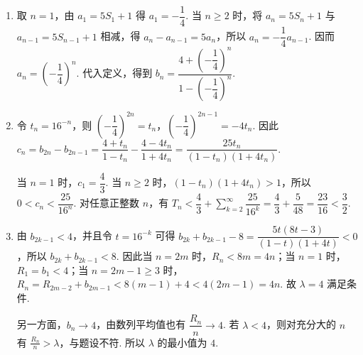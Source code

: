 \begin{solution}
\begin{enumerate}
\item 取 \(n=1\)，由 \(a_1=5S_1+1\) 得 \(a_1=-\dfrac14\). 当 \(n\geqslant2\) 时，将 \(a_n=5S_n+1\) 与 \(a_{n-1}=5S_{n-1}+1\) 相减，得 \(a_n-a_{n-1}=5a_n\)，所以 \(a_n=-\dfrac14a_{n-1}\). 因而 \(a_n=\left(-\dfrac14\right)^n\). 代入定义，得到 \(b_n=\dfrac{4+\left(-\dfrac14\right)^n}{1-\left(-\dfrac14\right)^n}\).
\item 令 \(t_n=16^{-n}\)，则 \(\left(-\dfrac14\right)^{2n}=t_n\)，\(\left(-\dfrac14\right)^{2n-1}=-4t_n\). 因此
\(c_n=b_{2n}-b_{2n-1}=\dfrac{4+t_n}{1-t_n}-\dfrac{4-4t_n}{1+4t_n}=\dfrac{25t_n}{(1-t_n)(1+4t_n)}\).

当 \(n=1\) 时，\(c_1=\dfrac43\). 当 \(n\geqslant2\) 时，\((1-t_n)(1+4t_n)>1\)，所以 \(0<c_n<\dfrac{25}{16^n}\). 对任意正整数 \(n\)，有 \(T_n<\dfrac43+\sum_{k=2}^{\infty}\dfrac{25}{16^k}=\dfrac43+\dfrac5{48}=\dfrac{23}{16}<\dfrac32\).
\item 由 \(b_{2k-1}<4\)，并且令 \(t=16^{-k}\) 可得 \(b_{2k}+b_{2k-1}-8=\dfrac{5t(8t-3)}{(1-t)(1+4t)}<0\)，所以 \(b_{2k}+b_{2k-1}<8\). 因此当 \(n=2m\) 时，\(R_n<8m=4n\)；当 \(n=1\) 时，\(R_1=b_1<4\)；当 \(n=2m-1\geqslant3\) 时，\(R_n=R_{2m-2}+b_{2m-1}<8(m-1)+4<4(2m-1)=4n\). 故 \(\lambda=4\) 满足条件.

另一方面，\(b_n\to4\)，由数列平均值也有 \(\dfrac{R_n}{n}\to4\). 若 \(\lambda<4\)，则对充分大的 \(n\) 有 \(\frac{R_n}{n}>\lambda\)，与题设不符. 所以 \(\lambda\) 的最小值为 \(4\).
\end{enumerate}
\end{solution}
